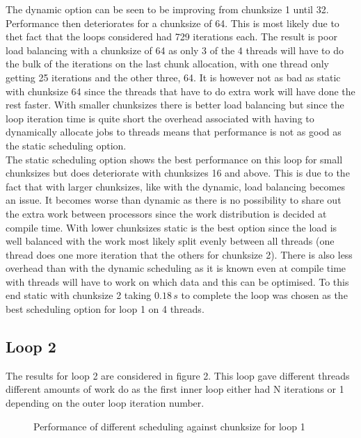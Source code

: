 \documentclass[12pt]{article}    %
\numberwithin{equation}{section}
\begin{document}
The dynamic option can be seen to be improving from chunksize 1 until 32.
Performance then deteriorates for a chunksize of 64.
This is most likely due to thet fact that the loops considered had 729 iterations each.
The result is poor load balancing with a chunksize of 64 as only 3 of the 4 threads will have to do the bulk of the iterations on the last chunk allocation, with one thread only getting 25 iterations and the other three, 64.
It is however not as bad as static with chunksize 64 since the threads that have to do extra work will have done the rest faster.
With smaller chunksizes there is better load balancing but since the loop iteration time is quite short the overhead associated with having to dynamically allocate jobs to threads means that performance is not as good as the static scheduling option.\\

The static scheduling option shows the best performance on this loop for small chunksizes but does deteriorate with chunksizes 16 and above.
This is due to the fact that with larger chunksizes, like with the dynamic, load balancing becomes an issue.
It becomes worse than dynamic as there is no possibility to share out the extra work between processors since the work distribution is decided at compile time.
With lower chunksizes static is the best option since the load is well balanced with the work most likely split evenly between all threads (one thread does one more iteration that the others for chunksize 2).
There is also less overhead than with the dynamic scheduling as it is known even at compile time with threads will have to work on which data and this can be optimised.
To this end static with chunksize 2 taking $0.18\,s$ to complete the loop was chosen as the best scheduling option for loop 1 on 4 threads.\\


\subsection{Loop 2}
The results for loop 2 are considered in figure 2.
This loop gave different threads different amounts of work do as the first inner loop either had N iterations or 1 depending on the outer loop iteration number.

	\begin{figure}[ht]
		\centering
		
		\caption{Performance of different scheduling against chunksize for loop 1}
		\label{Figure 2:}
	\end{figure}
\end{document}
